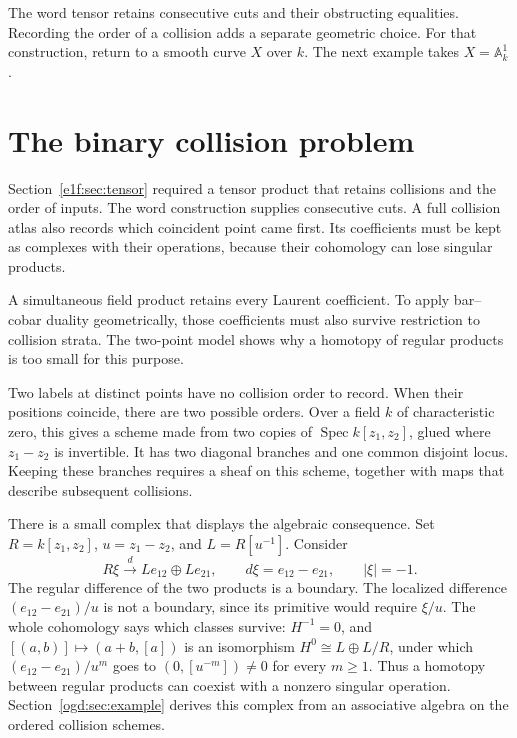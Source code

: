 The word tensor retains consecutive cuts and their obstructing equalities.
Recording the order of a collision adds a separate geometric choice.
For that construction, return to a smooth curve $X$ over $k$.
The next example takes $X=\mathbb A^1_k$.

\section{The binary collision problem}

Section~\ref{e1f:sec:tensor} required a tensor product that retains
collisions and the order of inputs. The word construction supplies
consecutive cuts. A full collision atlas also records which coincident
point came first. Its coefficients must be kept as complexes with their
operations, because their cohomology can lose singular products.

A simultaneous field product retains every Laurent coefficient.
To apply bar--cobar duality geometrically, those coefficients must also
survive restriction to collision strata. The two-point model shows why
a homotopy of regular products is too small for this purpose.

Two labels at distinct points have no collision order to record.
When their positions coincide, there are two possible orders.
Over a field \(k\) of characteristic zero, this gives a scheme made from two copies of
\(\operatorname{Spec}k[z_1,z_2]\), glued where \(z_1-z_2\) is invertible.
It has two diagonal branches and one common disjoint locus.
Keeping these branches requires a sheaf on this scheme, together with maps that describe subsequent collisions.

There is a small complex that displays the algebraic consequence.
Set\label{ogd:def:binary-chart-coefficients} \(R=k[z_1,z_2]\), \(u=z_1-z_2\), and \(L=R[u^{-1}]\).
Consider
\begin{equation}\label{ogd:eq:opening-binary}
 R\xi\xrightarrow{\ d\ }Le_{12}\oplus Le_{21},
 \qquad d\xi=e_{12}-e_{21},\qquad |\xi|=-1.
\end{equation}
The regular difference of the two products is a boundary.
The localized difference \((e_{12}-e_{21})/u\) is not a boundary, since its primitive would require \(\xi/u\).
The whole cohomology says which classes survive: \(H^{-1}=0\), and
\([(a,b)]\mapsto(a+b,[a])\) is an isomorphism \(H^0\cong L\oplus L/R\), under which
\((e_{12}-e_{21})/u^m\) goes to \((0,[u^{-m}])\ne0\) for every \(m\ge1\).
Thus a homotopy between regular products can coexist with a nonzero singular operation.
Section~\ref{ogd:sec:example} derives this complex from an associative algebra on the ordered collision schemes.

